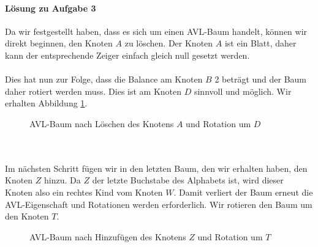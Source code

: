 \documentclass[11pt,a4paper]{scrartcl}
\begin{document}
\paragraph{Lösung zu Aufgabe 3}
\label{a4.3:lsg}
Da wir festgestellt haben, dass es sich um einen AVL-Baum handelt, können wir direkt beginnen, den Knoten $A$ zu löschen. Der Knoten $A$ ist ein Blatt, daher kann der entsprechende Zeiger einfach gleich null gesetzt werden. \\\\
Dies hat nun zur Folge, dass die Balance am Knoten $B$ 2 beträgt und der Baum daher rotiert werden muss. Dies ist am Knoten $D$ sinnvoll und möglich. Wir erhalten Abbildung \ref{fig:abb19}.
\begin{figure}[h]
\centering
{}
\caption{AVL-Baum nach Löschen des Knotens $A$ und Rotation um $D$}
\label{fig:abb19}
\end{figure}
\\\\
Im nächsten Schritt fügen wir in den letzten Baum, den wir erhalten haben, den Knoten $Z$ hinzu. Da $Z$ der letzte Buchstabe des Alphabets ist, wird dieser Knoten also ein rechtes Kind vom Knoten $W$. Damit verliert der Baum erneut die AVL-Eigenschaft und Rotationen werden erforderlich. Wir rotieren den Baum um den Knoten $T$.
\begin{figure}[h]
\centering
{}
\caption{AVL-Baum nach Hinzufügen des Knotens $Z$ und Rotation um $T$}
\end{figure}
\end{document}
